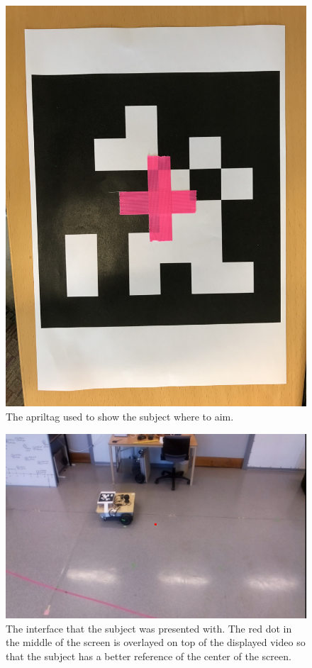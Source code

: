 \documentclass[nofilelist]{cslthse-msc}
\begin{document}
\begin{figure}[!hbt]
   \centering
   \includegraphics[scale=0.08]{images/apriltag.jpg} 
   \caption{The apriltag used to show the subject where to aim.}
   \label{fig:}
\end{figure}

\begin{figure}[!hbt]
   \centering
   \includegraphics[scale=0.3]{images/interface.png} 
   \caption{The interface that the subject was presented with. The red dot in the middle of the screen is overlayed on top of the displayed video so that the subject has a better reference of the center of the screen.}
   \label{fig:interface}
\end{figure}
\end{document}
